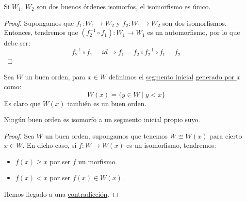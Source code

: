\begin{coro}
    Si $W_1$, $W_2$ son dos buenos órdenes isomorfos, el isomorfismo es único.
    \begin{proof}
        Supongamos que $f_1:W_1\to W_2$ y $f_2:W_1\to W_2$ son dos isomorfismos. Entonces, tendremos que $(f_2^{-1}\circ f_1):W_1\to W_1$ es un automorfismo, por lo que debe ser:
        \begin{equation*}
            f_2^{-1} \circ f_1 = id \Longrightarrow f_1 = f_2 \circ f_2^{-1} \circ f_1 = f_2
        \end{equation*}
    \end{proof}
\end{coro}

\begin{definicion}
Sea $W$ un buen orden, para $x\in W$ definimos el \underline{segmento inicial} \underline{generado por $x$} como:
    \begin{equation*}
        W(x) = \{y\in W \mid y < x\}
    \end{equation*}
    Es claro que $W(x)$ también es un buen orden.
\end{definicion}

\begin{lema}
    Ningún buen orden es isomorfo a un segmento inicial propio suyo.
    \begin{proof}
        Sea $W$ un buen orden, supongamos que tenemos $W\cong W(x)$ para cierto $x\in W$. En dicho caso, si $f:W\to W(x)$ es un isomorfismo, tendremos:
        \begin{itemize}
            \item $f(x)\geq x$ por ser $f$ un morfismo.
            \item $f(x) < x$ por ser $f(x) \in W(x)$.
        \end{itemize}
        Hemos llegado a una \underline{contradicción}.
    \end{proof}
\end{lema}

